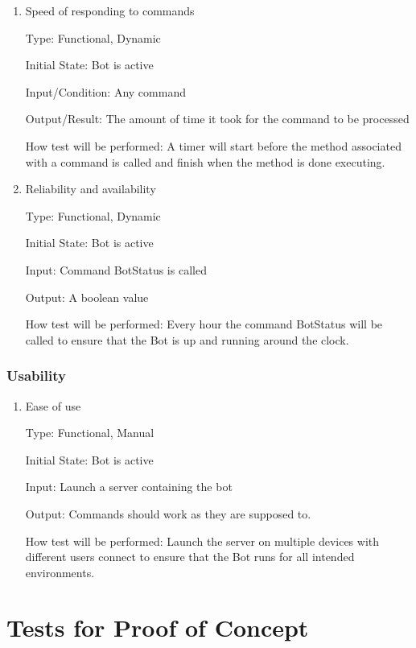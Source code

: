 \documentclass[12pt, titlepage]{article}
\begin{document}
\begin{enumerate}

\item{Speed of responding to commands}

Type: Functional, Dynamic
					
Initial State: Bot is active
					
Input/Condition: Any command
					
Output/Result: The amount of time it took for the command to be processed
					
How test will be performed: A timer will start before the method associated with a command is called and finish when the method is done executing. 
					
\item{Reliability and availability\\}

Type: Functional, Dynamic
					
Initial State: Bot is active
					
Input: Command BotStatus is called
					
Output: A boolean value 
					
How test will be performed: Every hour the command BotStatus will be called to ensure that the Bot is up and running around the clock.

\end{enumerate}

\subsubsection{Usability}

\begin{enumerate}

\item{Ease of use\\}

Type: Functional, Manual
					
Initial State: Bot is active
					
Input: Launch a server containing the bot
					
Output: Commands should work as they are supposed to.
					
How test will be performed: Launch the server on multiple devices with different users connect to ensure that the Bot runs for all intended environments.

\end{enumerate}

\section{Tests for Proof of Concept}
\end{document}
